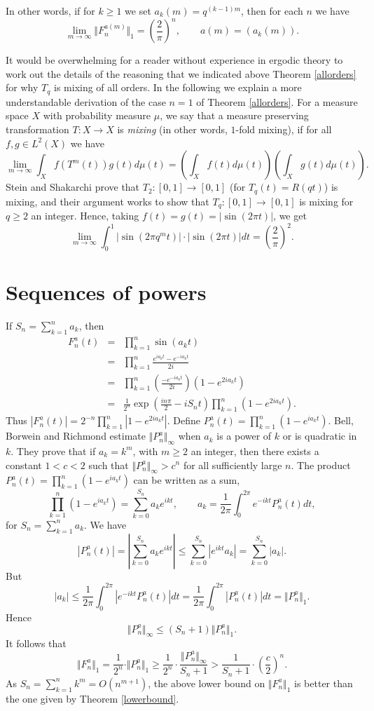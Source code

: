 \documentclass{amsart}
\newcommand{\norm}[1]{\Vert #1 \Vert}
\begin{document}
In other words, if for $k \geq 1$ we set $a_k(m)=q^{(k-1)m}$, then for each $n$ we have
\[
\lim_{m \to \infty} \norm{F_n^{a(m)}}_1 = \left( \frac{2}{\pi} \right)^n,\qquad a(m)=(a_k(m)).
\]

It would be overwhelming for a reader without experience in ergodic theory to work out the details of the reasoning  that we indicated above Theorem \ref{allorders}
for why $T_q$ is mixing of all orders. In the following we explain a more understandable derivation of the case $n=1$ of Theorem \ref{allorders}.
For a measure space $X$ with probability measure $\mu$, we say that a measure preserving transformation
$T:X \to X$ is {\em mixing} (in other words, $1$-fold mixing), if for all $f,g \in L^2(X)$ we have
\[
\lim_{m \to \infty} \int_X f\left(T^m(t)\right)g(t) d\mu(t)=\left(\int_X f(t) d\mu(t) \right) \left( \int_X g(t) d\mu(t) \right).
\]
Stein and Shakarchi \cite[p.~305]{steinIII} prove that $T_2:[0,1] \to[0,1]$ (for $T_q(t)=R(qt)$)
is mixing, and their argument works to show that
$T_q:[0,1] \to [0,1]$ is mixing for $q \geq 2$ an integer. Hence, taking $f(t)=g(t)=|\sin(2\pi t)|$, we get
\[
\lim_{m \to \infty} \int_0^1 |\sin(2\pi q^m t)| \cdot |\sin(2\pi t)| dt=\left( \frac{2}{\pi} \right)^2.
\]

\section{Sequences of powers}
If $S_n=\sum_{k=1}^n a_k$, then
\begin{eqnarray*}
F_n^a(t)&=&\prod_{k=1}^n \sin(a_k t)\\
&=&\prod_{k=1}^n \frac{e^{ia_kt}-e^{-ia_kt}}{2i}\\
&=&\prod_{k=1}^n \left(\frac{-e^{-ia_kt}}{2i} \right) \left(1-e^{2ia_kt} \right)\\
&=&\frac{1}{2^n} \exp\left(\frac{in\pi}{2} -iS_nt \right) \prod_{k=1}^n \left(1-e^{2ia_kt} \right).
\end{eqnarray*}
Thus $|F_n^a(t)|=2^{-n}  \prod_{k=1}^n \left | 1-e^{2ia_kt} \right |$. Define $P_n^a(t)=
\prod_{k=1}^n \left( 1-e^{ia_kt} \right)$.
Bell, Borwein and Richmond \cite{MR1654470} estimate $\norm{P_n^a}_\infty$ when $a_k$ is a power of $k$ or is quadratic in $k$.
They prove that if $a_k=k^m$, with $m \geq 2$ an integer, then there exists a constant $1<c<2$ such that
$\norm{P_n^a}_\infty>c^n$ for all sufficiently large $n$.
The product $P_n^a(t)=\prod_{k=1}^n (1-e^{ia_kt})$ can be written as a sum,
\[
\prod_{k=1}^n (1-e^{ia_kt})=\sum_{k=0}^{S_n} a_k e^{ikt}, \qquad a_k=\frac{1}{2\pi} \int_0^{2\pi} e^{-ikt} P_n^a(t) dt,
\]
for $S_n=\sum_{k=1}^n a_k$. We have
\[
|P_n^a(t)|=\left| \sum_{k=0}^{S_n} a_k e^{ikt} \right| \leq \sum_{k=0}^{S_n} |e^{ikt} a_k| = \sum_{k=0}^{S_n} |a_k|.
\]
But
\[
|a_k|  \leq \frac{1}{2\pi} \int_0^{2\pi} \left| e^{-ikt} P_n^a(t) \right| dt
=\frac{1}{2\pi} \int_0^{2\pi} |P_n^a(t)| dt=\norm{P_n^a}_1.
\]
Hence
\[
\norm{P_n^a}_\infty \leq (S_n+1) \norm{P_n^a}_1.
\]
It follows that
\[
\norm{F_n^a}_1 = \frac{1}{2^n}\cdot  \norm{P_n^a}_1  \geq  \frac{1}{2^n}\cdot \frac{\norm{P_n^a}_\infty}{S_n+1}
>\frac{1}{S_n+1} \cdot \left(\frac{c}{2} \right)^n.
\]
As $S_n=\sum_{k=1}^n k^m=O(n^{m+1})$, the above lower bound on $\norm{F_n^a}_1$ is better than the one given by Theorem \ref{lowerbound}.



\end{document}
